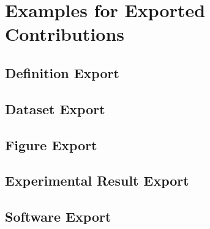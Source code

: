 \section{Examples for Exported Contributions}

\subsection*{Definition Export}

\subsection*{Dataset Export}

\subsection*{Figure Export}

\subsection*{Experimental Result Export}

\subsection*{Software Export}

